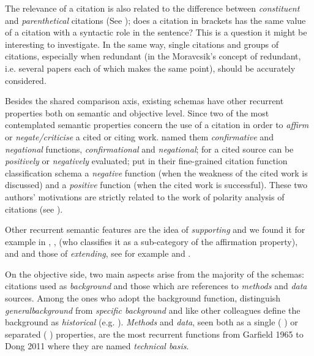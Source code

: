 \documentclass[runningheads,a4paper]{llncs}
\begin{document}
The relevance of a citation is also related to the difference between {\em constituent} and {\em parenthetical} citations (See  \cite{__RefNumPara__4565_348126194}); does a citation in brackets has the same value of a citation with a syntactic role in the sentence? This is a question it might be interesting to investigate. In the same way, single citations and groups of citations, especially when redundant (in the Moravcsik's concept of redundant, i.e. several papers each of which makes the same point), should be accurately considered.

Besides the shared comparison axis, existing schemas have other recurrent properties both on semantic and objective level. Since  \cite{__RefNumPara__4567_348126194} two of the most contemplated semantic properties concern the use of a citation in order to {\em affirm} or {\em negate/criticise} a cited or citing work.  \cite{__RefNumPara__4489_348126194} named them {\em confirmative} and {\em negational} functions,  \cite{__RefNumPara__4569_348126194}{\em confirmational} and {\em negational}; for  \cite{__RefNumPara__4571_348126194} a cited source can be {\em positively} or {\em negatively} evaluated;  \cite{__RefNumPara__4563_348126194} put in their fine-grained citation function classification schema a {\em negative} function (when the weakness of the cited work is discussed) and a {\em positive} function (when the cited work is successful). These two authors' motivations are strictly related to the work of polarity analysis of citations (see  \cite{__RefNumPara__9446_348126194}).

Other recurrent semantic features are the idea of {\em supporting} and we found it for example in  \cite{__RefNumPara__4575_348126194},  \cite{__RefNumPara__4577_348126194},  \cite{__RefNumPara__3011_348126194} (who classifies it as a sub-category of the affirmation property),  \cite{__RefNumPara__4481_348126194} and  \cite{__RefNumPara__4579_348126194} and those of {\em extending}, see for example  \cite{__RefNumPara__4561_348126194} and  \cite{__RefNumPara__6140_348126194}.

On the objective side, two main aspects arise from the majority of the schemas: citations used as {\em background} and those which are references to {\em methods} and {\em data} sources. Among the ones who adopt the background function,  \cite{__RefNumPara__4583_348126194} distinguish {\em general}{\em background} from {\em specific background} and like other colleagues define the background as {\em historical} (e.g.  \cite{__RefNumPara__4691_348126194}). {\em Methods} and {\em data}, seen both as a single ( \cite{__RefNumPara__3096_348126194}) or separated ( \cite{__RefNumPara__4693_348126194}) properties, are the most recurrent functions from Garfield 1965 to Dong 2011 where they are named {\em technical basis}.
\end{document}
